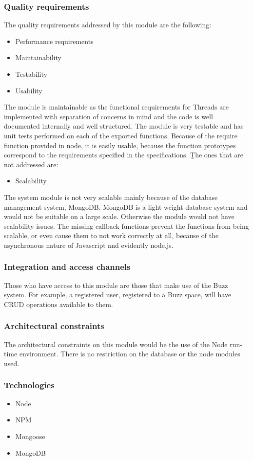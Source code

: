 \begin{flushleft}
\subsubsection{Quality requirements}
The quality requirements addressed by this module are the following:
\begin{itemize}
\item Performance requirements
\item Maintainability
\item Testability
\item Usability
\end{itemize}
The module is maintainable as the functional requirements for Threads are implemented with separation of concerns in mind and the code is well documented internally and well structured. 
The module is very testable and has unit tests performed on each of the exported functions. Because of the require function provided in node, it is easily usable, because the function prototypes correspond to the requirements specified in the specifications.
\b
The ones that are not addressed are:
\begin{itemize}
\item Scalability
\end{itemize}
The system module is not very scalable mainly because of the database management system, MongoDB. MongoDB is a light-weight database system and would not be suitable on a large scale. Otherwise the module would not have scalability issues. The missing callback functions prevent the functions from being scalable, or even cause them to not work correctly at all, because of the asynchronous nature of Javascript and evidently node.js.

\subsubsection{Integration and access channels}
Those who have access to this module are those that make use of the Buzz system. For example, a registered user, registered to a Buzz space, will have CRUD operations available to them.

\subsubsection{Architectural constraints}
The architectural constraints on this module would be the use of the Node run-time environment. There is no restriction on the database or the node modules used.

\subsubsection{Technologies}
\begin{itemize}
\item Node
\item NPM
\item Mongoose
\item MongoDB
\end{itemize}

\end{flushleft}
